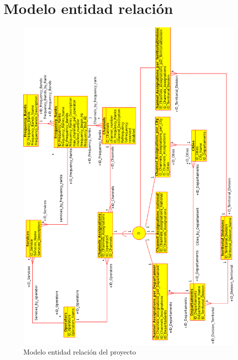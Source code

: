 \section*{Modelo entidad relación} \label{modER}

\begin{figure}[H]
	\centering
	\includegraphics[width=13.5cm]{Anexos/Imagenes/TGDB.png}
	\caption{Modelo entidad relación del proyecto}
	\label{fig:modeloER}	
\end{figure}
